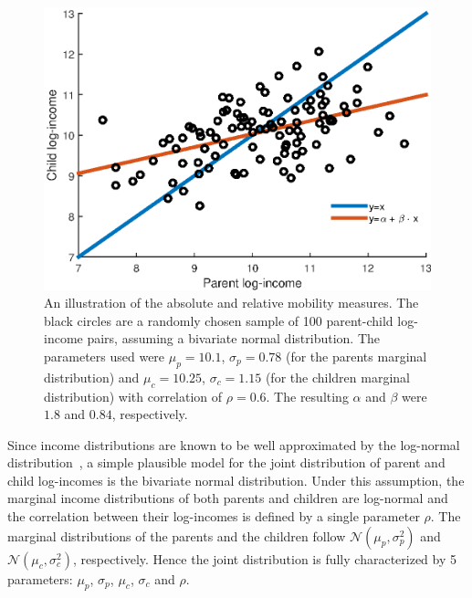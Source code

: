 \documentclass[12pt]{article}
\newcommand{\flabel}[1]{\label{fig:#1}}
\numberwithin{equation}{section}
\begin{document}
\begin{figure}[!htb]
\centering
\includegraphics[width=1.0\textwidth]{./figs/bivariate_lines3.eps}
\caption{An illustration of the absolute and relative mobility measures. The black circles are a randomly chosen sample of 100 parent-child log-income pairs, assuming a bivariate normal distribution. The parameters used were $\mu_p=10.1$, $\sigma_p=0.78$ (for the parents marginal distribution) and $\mu_c=10.25$, $\sigma_c=1.15$ (for the children marginal distribution) with correlation of $\rho=0.6$. The resulting $\alpha$ and $\beta$ were $1.8$ and $0.84$, respectively.}
\flabel{lines}
\end{figure}

Since income distributions are known to be well approximated by the log-normal distribution~\citep{pinkovskiy2009parametric}, a simple plausible model for the joint distribution of parent and child log-incomes is the bivariate normal distribution. Under this assumption, the marginal income distributions of both parents and children are log-normal and the correlation between their log-incomes is defined by a single parameter $\rho$. The marginal distributions of the parents and the children follow $\mathcal{N}\left(\mu_p,\sigma_p^2\right)$ and $\mathcal{N}\left(\mu_c,\sigma_c^2\right)$, respectively. Hence the joint distribution is fully characterized by 5 parameters: $\mu_p$, $\sigma_p$, $\mu_c$, $\sigma_c$ and $\rho$.
\end{document}
